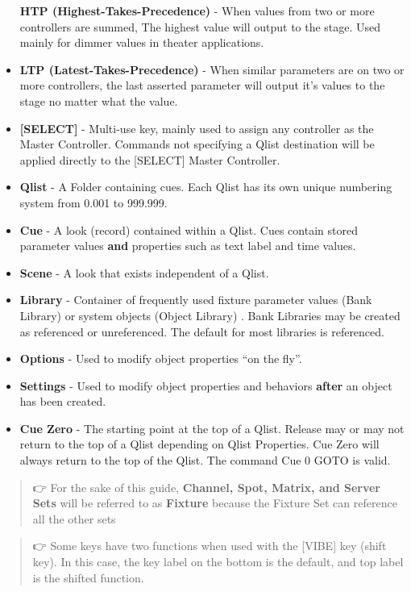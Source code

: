 \documentclass[
]{article}
\begin{document}
\begin{itemize}
  \textbf{HTP (Highest-Takes-Precedence)} - When values from two or more controllers are summed, The highest value will output to the stage. Used mainly for dimmer values in theater applications.
\item
  \textbf{LTP (Latest-Takes-Precedence)} - When similar parameters are on two or more controllers, the last asserted parameter will output it's values to the stage no matter what the value.
\item
  \textbf{{[}SELECT{]}} - Multi-use key, mainly used to assign any controller as the Master Controller. Commands not specifying a Qlist destination will be applied directly to the {[}SELECT{]} Master Controller.
\item
  \textbf{Qlist} - A Folder containing cues. Each Qlist has its own unique numbering system from 0.001 to 999.999.
\item
  \textbf{Cue} - A look (record) contained within a Qlist. Cues contain stored parameter values \textbf{and} properties such as text label and time values.
\item
  \textbf{Scene} - A look that exists independent of a Qlist.
\item
  \textbf{Library} - Container of frequently used fixture parameter values (Bank Library) or system objects (Object Library) . Bank Libraries may be created as referenced or unreferenced. The default for most libraries is referenced.
\item
  \textbf{Options} - Used to modify object properties ``on the fly''.
\item
  \textbf{Settings} - Used to modify object properties and behaviors \textbf{after} an object has been created.
\item
  \textbf{Cue Zero} - The starting point at the top of a Qlist. Release may or may not return to the top of a Qlist depending on Qlist Properties. Cue Zero will always return to the top of the Qlist. The command Cue 0 GOTO is valid.
\end{itemize}

\begin{quote}
👉 For the sake of this guide, \textbf{Channel, Spot, Matrix, and Server Sets} will be referred to as \textbf{Fixture} because the Fixture Set can reference all the other sets
\end{quote}

\begin{quote}
👉 Some keys have two functions when used with the {[}VIBE{]} key (shift key). In this case, the key label on the bottom is the default, and top label is the shifted function.
\end{quote}
\end{document}
